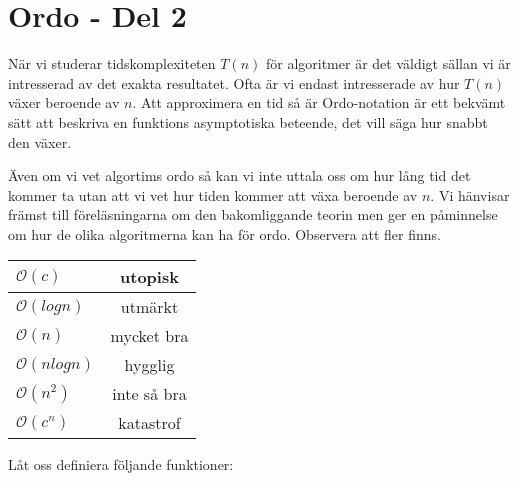 \documentclass{article}
\begin{document}
  
   \section*{Ordo - Del 2
    }
  
  När vi studerar tidskomplexiteten $T(n)$ för algoritmer är det väldigt sällan vi är intresserad av det exakta resultatet. Ofta är vi endast intresserade av hur $T(n)$ växer beroende av $n$. Att approximera en tid så är Ordo-notation är ett bekvämt sätt att beskriva en funktions asymptotiska beteende, det vill säga hur snabbt den växer.
  
Även om vi vet algortims ordo så kan vi inte uttala oss om hur lång tid det kommer ta utan att vi vet hur tiden kommer att växa beroende av $n$. Vi hänvisar främst till föreläsningarna om den bakomliggande teorin men ger en påminnelse om hur de olika algoritmerna kan ha för ordo. Observera att fler finns. 
  
  \begin{center}
    \begin{tabular}{| l | c |}
      \hline
      \texttt{$\mathcal{O}(c)$} & utopisk\\ \hline
      \texttt{$\mathcal{O}(log n)$} & utmärkt \\ \hline
      \texttt{$\mathcal{O}(n)$} & mycket bra\\ \hline
      \texttt{$\mathcal{O}(n log n)$} & hygglig \\ \hline
      \texttt{$\mathcal{O}(n^2)$} & inte så bra \\ \hline
      \texttt{$\mathcal{O}(c^n)$} & katastrof \\
      \hline
    \end{tabular}
  \end{center}
  Låt oss definiera följande funktioner: \\
  
\end{document}
